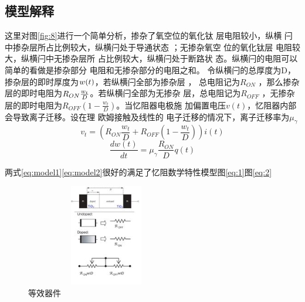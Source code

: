 \documentclass[UTF8]{article}
\begin{document}
\subsection{模型解释}
这里对图\eqref{fig:8}进行一个简单分析，掺杂了氧空位的氧化钛 层电阻较小，纵横 闩中掺杂层所占比例较大，纵横闩处于导通状态 ；无掺杂氧空 位的氧化钛层 电阻较大，纵横闩中无掺杂层所 占比例较大，纵横闩处于断路状 态。纵横闩的电阻可以简单的看做是掺杂部分 电阻和无掺杂部分的电阻之和。 令纵横闩的总厚度为D，掺杂层的即时厚度为$\mathnormal{w(t)}   $，若纵横闩全部为掺杂层 ， 总电阻记为$R_{ON}$ ，那么掺杂层的即时电阻为$R_{ON} \frac{\mathnormal{w_{t}}}{\mathnormal{D}}$。若纵横闩全部为无掺杂 层，总电阻记为$R_{OFF}$ ，无掺杂层的即时电阻为$R_{OFF}(1 - \frac{w_{t}}{D})$。当忆阻器电极施 加偏置电压$v(t)$，忆阻器内部会导致离子迁移\cite{mem2013}。设在理 欧姆接触及线性的 电子迁移的情况下，离子迁移率为$\mu_{\gamma}$
\begin{equation}\label{eq:model1}
v_{t} = (R_{ON} \frac{w_{t}}{D} + R_{OFF}(1 - \frac{w_{t}}{D}) ) i(t)
\end{equation}
\begin{equation}\label{eq:model2}
\frac{dw(t)}{dt} = \mu_{\gamma}\frac{R_{ON}}{D}q(t)
\end{equation}

两式\eqref{eq:model1}\eqref{eq:model2}很好的满足了忆阻数学特性模型图\eqref{eq:1}图\eqref{eq:2}


\begin{figure}[htbp]
\centering
\includegraphics[width=2.77in,height=1.75in]{pic/no2.jpeg}

\caption{等效器件}
\label{fig:graph}
\end{figure}




\end{document}
